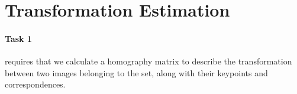 \section{Transformation Estimation}

\paragraph{Task 1} requires that we calculate a homography matrix to describe the transformation between two images belonging to the \HG set, along with their keypoints and correspondences.